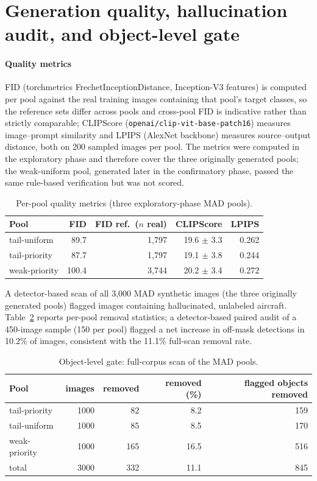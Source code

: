 \section{Generation quality, hallucination audit, and object-level gate}\label{app:audit}
\paragraph{Quality metrics}
FID (torchmetrics FrechetInceptionDistance, Inception-V3 features) is computed per pool against the real training images containing that pool's target classes, so the reference sets differ across pools and cross-pool FID is indicative rather than strictly comparable; CLIPScore (\texttt{openai/clip-vit-base-patch16}) measures image--prompt similarity and LPIPS (AlexNet backbone) measures source--output distance, both on 200 sampled images per pool. The metrics were computed in the exploratory phase and therefore cover the three originally generated pools; the weak-uniform pool, generated later in the confirmatory phase, passed the same rule-based verification but was not scored.
\begin{table}[h]\centering\small\caption{Per-pool quality metrics (three exploratory-phase MAD pools).}\label{tab:quality}
\begin{tabular}{lrrrr}\toprule
Pool & FID & FID ref.\ ($n$ real) & CLIPScore & LPIPS \\ \midrule
tail-uniform & 89.7 & 1,797 & 19.6 $\pm$ 3.3 & 0.262 \\
tail-priority & 87.7 & 1,797 & 19.1 $\pm$ 3.8 & 0.244 \\
weak-priority & 100.4 & 3,744 & 20.2 $\pm$ 3.4 & 0.272 \\
\bottomrule\end{tabular}\end{table}
A detector-based scan of all 3{,}000 MAD synthetic images (the three originally generated pools) flagged images containing hallucinated, unlabeled aircraft. Table~\ref{tab:gate} reports per-pool removal statistics; a detector-based paired audit of a 450-image sample (150 per pool) flagged a net increase in off-mask detections in 10.2\% of images, consistent with the 11.1\% full-scan removal rate.
\begin{table}[h]\centering\small\caption{Object-level gate: full-corpus scan of the MAD pools.}\label{tab:gate}
\begin{tabular}{lrrrr}\toprule
Pool & images & removed & removed (\%) & flagged objects removed \\ \midrule
tail-priority & 1000 & 82 & 8.2 & 159 \\
tail-uniform & 1000 & 85 & 8.5 & 170 \\
weak-priority & 1000 & 165 & 16.5 & 516 \\
\midrule total & 3000 & 332 & 11.1 & 845 \\
\bottomrule\end{tabular}\end{table}
